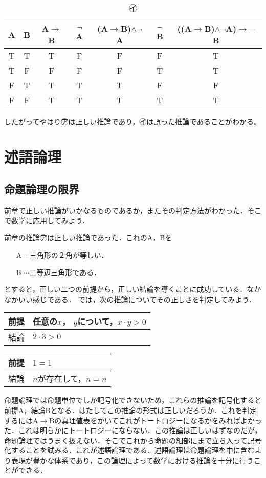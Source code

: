 \documentclass[10pt,b5paper,papersize,dvipdfmx]{jsbook}
\begin{document}
\begin{table}[H]
\begin{center}
\caption{\textcircled{\scriptsize イ}}
\begin{tabular}{|c|c||c|c|c|c|c|}\hline
A&B&A$\to$B&$\lnot$A&(A$\to$B)$\land\lnot$A&$\lnot$B&((A$\to$B)$\land\lnot$A)$\to\lnot$B \\ \hline \hline
T&T&T&F&F&F&T \\ \hline
T&F&F&F&F&T&T \\ \hline
F&T&T&T&T&F&F \\ \hline
F&F&T&T&T&T&T \\ \hline
\end{tabular}
\end{center}
\end{table}
したがってやはり\textcircled{\scriptsize ア}は正しい推論であり，\textcircled{\scriptsize イ}は誤った推論であることがわかる。

\section{述語論理}
\subsection{命題論理の限界}
前章で正しい推論がいかなるものであるか，またその判定方法がわかった．そこで数学に応用してみよう．\par
前章の推論\textcircled{\scriptsize ア}は正しい推論であった．これのA，Bを
\begin{itemize}
\item[A]$\cdots$三角形の２角が等しい．
\item[B]$\cdots$二等辺三角形である．
\end{itemize}
とすると，正しい二つの前提から，正しい結論を導くことに成功している．なかなかいい感じである．
では，次の推論についてその正しさを判定してみよう．
\begin{table}[H]
\begin{tabular}{ll}
前提&任意の$x$， $y$について，$x\cdot y>0$ \\ \hline
結論&$2\cdot 3>0$\\
\end{tabular}
\end{table}
\begin{table}[H]
\begin{tabular}{ll}
前提&$1=1$ \\ \hline
結論&$n$が存在して，$n=n$\\
\end{tabular}
\end{table}
命題論理では命題単位でしか記号化できないため，これらの推論を記号化すると前提A，結論Bとなる．はたしてこの推論の形式は正しいだろうか．これを判定するにはA$\to$Bの真理値表をかいてこれがトートロジーになるかをみればよかった．これは明らかにトートロジーにならない．この推論は正しいはずなのだが，命題論理ではうまく扱えない．そこでこれから命題の細部にまで立ち入って記号化することを試みる．これが述語論理である．述語論理は命題論理を中に含むより表現が豊かな体系であり，この論理によって数学における推論を十分に行うことができる．
\end{document}
